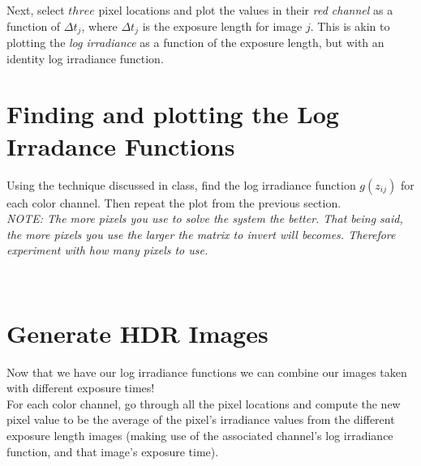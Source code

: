 \documentclass{article}
\begin{document}
\noindent
Next, select $three$ pixel locations and plot the values in their \emph{red channel} as a function of $\Delta t_j$, where $\Delta t_j$ is the exposure length for image $j$.  This is akin to plotting the \emph{log irradiance} as a function of the exposure length, but with an identity log irradiance function.\\

\begin{figure}[h]
    \centering
\end{figure}

\newpage
\section{Finding and plotting the Log Irradance Functions}
Using the technique discussed in class, find the log irradiance function $g(z_{ij})$ for each color channel.  Then repeat the plot from the previous section.\\

\noindent
\emph{NOTE:  The more pixels you use to solve the system the better.  That being said, the more pixels you use the larger the matrix to invert will becomes.   Therefore experiment with how many pixels to use.}

\begin{figure}[h]
    \centering
    \\
\end{figure}

\newpage

\section{Generate HDR Images}
Now that we have our log irradiance functions we can combine our images taken with different exposure times!\\

\noindent
For each color channel, go through all the pixel locations and compute the new pixel value to be the average of the pixel's irradiance values from the different exposure length images (making use of the associated channel's log irradiance function, and that image's exposure time).\\  
\end{document}
